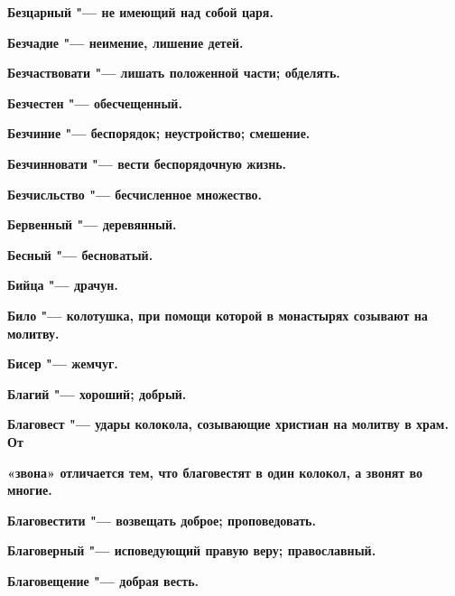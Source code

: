 \begin{mymulticols}{2}
\bfseries Безцарный\normalfont{} "--- не имеющий над собой царя. 




\bfseries Безчадие\normalfont{} "--- неимение, лишение детей. 




\bfseries Безчаствовати\normalfont{} "--- лишать положенной части; обделять. 




\bfseries Безчестен\normalfont{} "--- обесчещенный. 




\bfseries Безчиние\normalfont{} "--- беспорядок; неустройство; смешение. 




\bfseries Безчинновати\normalfont{} "--- вести беспорядочную жизнь. 




\bfseries Безчисльство\normalfont{} "--- бесчисленное множество. 




\bfseries Бервенный\normalfont{} "--- деревянный. 




\bfseries Бесный\normalfont{} "--- бесноватый. 




\bfseries Бийца\normalfont{} "--- драчун. 




\bfseries Било\normalfont{} "--- колотушка, при помощи которой в монастырях созывают на молитву. 




\bfseries Бисер\normalfont{} "--- жемчуг. 




\bfseries Благий\normalfont{} "--- хороший; добрый. 




\bfseries Благовест\normalfont{} "--- удары колокола, созывающие христиан на молитву в храм. От 




\bfseries «звона»\normalfont{} отличается тем, что благовестят в один колокол, а звонят во многие. 




\bfseries Благовестити\normalfont{} "--- возвещать доброе; проповедовать. 




\bfseries Благоверный\normalfont{} "--- исповедующий правую веру; православный. 




\bfseries Благовещение\normalfont{} "--- добрая весть. 





\end{mymulticols}
